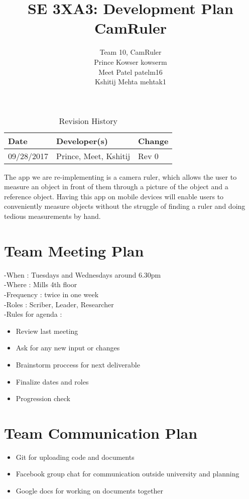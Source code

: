 \documentclass{article}
\title{SE 3XA3: Development Plan\\CamRuler}
\author{Team 10, CamRuler
		\\ Prince Kowser kowserm
		\\ Meet Patel patelm16
		\\ Kshitij Mehta mehtak1
}
\date{}
\begin{document}
\begin{table}[hp]
\caption{Revision History} \label{TblRevisionHistory}
\begin{tabularx}{\textwidth}{llX}
\toprule
\textbf{Date} & \textbf{Developer(s)} & \textbf{Change}\\
\midrule
09/28/2017 & Prince, Meet, Kshitij & Rev 0\\
\bottomrule
\end{tabularx}
\end{table}

\newpage

\maketitle

The app we are re-implementing is a camera ruler, which allows the user to measure an object in front of them through a picture of the object and a reference object. Having this app on mobile devices will enable users to conveniently measure objects without the struggle of finding a ruler and doing tedious measurements by hand. 

\section{Team Meeting Plan}
-When : Tuesdays and Wednesdays around 6.30pm
\\-Where : Mills 4th floor
\\-Frequency : twice in one week
\\-Roles : Scriber, Leader, Researcher 
\\-Rules for agenda : 
\begin{itemize}
 \item Review last meeting 
 \item Ask for any new input or changes
 \item Brainstorm proccess for next deliverable
 \item Finalize dates and roles
 \item Progression check
\end{itemize}

  
\section{Team Communication Plan}
 \begin{itemize}
 \item Git for uploading code and documents
 \item Facebook group chat for communication outside university and planning 
 \item Google docs for working on documents together 

\end{itemize}
\end{document}
